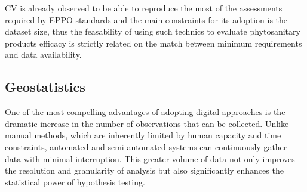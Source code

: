 \documentclass[12pt,a4paper,oneside]{report}
\begin{document}
CV is already observed to be able to reproduce the most of the assessments
required by EPPO standards and the main constraints for its adoption is the dataset size, 
thus the feasability of using such technics to evaluate phytosanitary products
efficacy is strictly related on the match between minimum requirements and data
availability.

\subsection{Geostatistics}

One of the most compelling advantages of adopting digital approaches is the
dramatic increase in the number of observations that can be collected. Unlike
manual methods, which are inherently limited by human capacity and time
constraints, automated and semi-automated systems can continuously gather data
with minimal interruption. This greater volume of data not only improves the
resolution and granularity of analysis but also significantly enhances the
statistical power of hypothesis testing.
\end{document}
